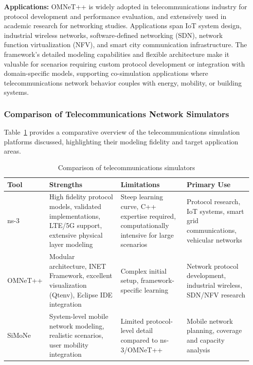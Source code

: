 \textbf{Applications:} OMNeT++ is widely adopted in telecommunications industry for protocol development and performance evaluation, and extensively used in academic research for networking studies. Applications span IoT system design, industrial wireless networks, software-defined networking (SDN), network function virtualization (NFV), and smart city communication infrastructure. The framework's detailed modeling capabilities and flexible architecture make it valuable for scenarios requiring custom protocol development or integration with domain-specific models, supporting co-simulation applications where telecommunications network behavior couples with energy, mobility, or building systems.

\subsubsection{Comparison of Telecommunications Network Simulators}

Table~\ref{tab:telecom_comparison} provides a comparative overview of the telecommunications simulation platforms discussed, highlighting their modeling fidelity and target application areas.

\begin{table}[h]
    \centering
    \caption{Comparison of telecommunications simulators}
    \label{tab:telecom_comparison}
    \begin{tabular}{|p{2.5cm}|p{4.5cm}|p{4cm}|p{3cm}|}
        \hline
        \textbf{Tool} & \textbf{Strengths} & \textbf{Limitations} & \textbf{Primary Use} \\
        \hline
        ns-3 & High fidelity protocol models, validated implementations, LTE/5G support, extensive physical layer modeling & Steep learning curve, C++ expertise required, computationally intensive for large scenarios & Protocol research, IoT systems, smart grid communications, vehicular networks \\
        \hline
        OMNeT++ & Modular architecture, INET Framework, excellent visualization (Qtenv), Eclipse IDE integration & Complex initial setup, framework-specific learning & Network protocol development, industrial wireless, SDN/NFV research \\
        \hline
        SiMoNe & System-level mobile network modeling, realistic scenarios, user mobility integration & Limited protocol-level detail compared to ns-3/OMNeT++ & Mobile network planning, coverage and capacity analysis \\
        \hline
    \end{tabular}
\end{table}





